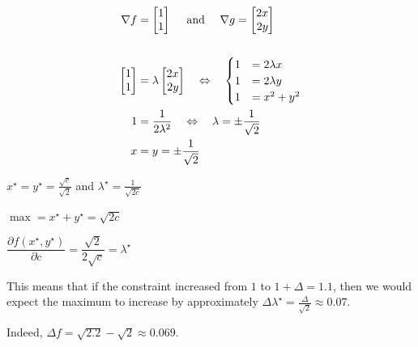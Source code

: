\begin{solution}
\begin{slide}

\begin{parts}
	\item 
	\begin{align*}
		\nabla f & = \mat{1\\1}  
			\quad \text{ and } \quad \nabla g = \mat{2x\\2y} \\
		\\
		\mat{1\\1} & = \lambda \mat{2x \\ 2y} \quad \Leftrightarrow \quad 
			\begin{cases}
				1 & = 2\lambda x \\
				1 & = 2\lambda y \\
				1 & = x^2 + y^2	
			\end{cases}
			\\
		1 & = \frac{1}{2 \lambda^2} \quad \Leftrightarrow\quad 
			\lambda = \pm\frac{1}{\sqrt{2}}\\
		x & = y = \pm \frac{1}{\sqrt{2}}
	\end{align*}
	
	\item $x^\star=y^\star= \frac{\sqrt{c}}{\sqrt{2}}$ \quad and \quad $\lambda^\star = \frac{1}{\sqrt{2c}}$
		 
		 $\max = x^\star+y^\star=\sqrt{2c}$
		
	\item $\dfrac{\partial f(x^\star,y^\star)}{\partial c}
			= \dfrac{\sqrt{2}}{2\sqrt{c}} = \lambda^\star$

	\item This means that if the constraint increased from $1$ to $1 + \Delta = 1.1$, 	then we would expect the maximum to increase by approximately $\Delta \lambda^\star = \frac{\Delta}{\sqrt{2}} \approx 0.07$.
		
		Indeed, $\Delta f = \sqrt{2.2}-\sqrt{2} \approx 0.069$.

\end{parts}
	
\end{slide}	
\end{solution}


